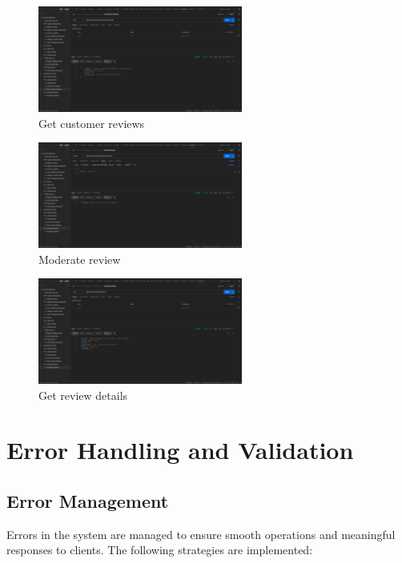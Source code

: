 \documentclass[a4paper,12pt]{article}
\begin{document}
\begin{figure}[H]
  \centering
  \includegraphics[width=0.6\textwidth]{images/19.png}
  \caption{Get customer reviews}
\end{figure}
\begin{figure}[H]
  \centering
  \includegraphics[width=0.6\textwidth]{images/20.png}
  \caption{Moderate review}
\end{figure}
\begin{figure}[H]
  \centering
  \includegraphics[width=0.6\textwidth]{images/21.png}
  \caption{Get review details}
\end{figure}

\section{Error Handling and Validation}
\subsection{Error Management}
Errors in the system are managed to ensure smooth operations and meaningful responses to clients. The following strategies are implemented:
\end{document}
